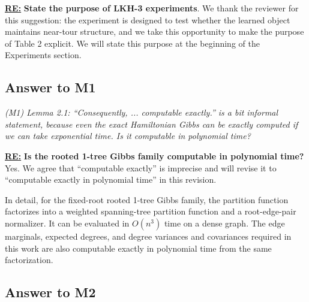 \textbf{\underline{RE:}}
\textbf{State the purpose of LKH-3 experiments}. We thank the reviewer for this suggestion: the experiment is designed to test whether the learned object maintains near-tour structure, and we take this opportunity to make the purpose of Table 2 explicit. We will state this purpose at the beginning of the Experiments section.



\subsection{Answer to M1}

\textit{(M1) Lemma 2.1: ``Consequently, ... computable exactly.'' is a bit informal statement, because even the exact Hamiltonian Gibbs can be exactly computed if we can take exponential time. Is it computable in polynomial time?}

\textbf{\underline{RE:}}
\textbf{Is the rooted 1-tree Gibbs family computable in polynomial time?}
Yes. We agree that ``computable exactly'' is imprecise and will revise it to ``computable exactly in polynomial time'' in this revision.

In detail, for the fixed-root rooted 1-tree Gibbs family, the partition function factorizes into a weighted spanning-tree partition function and a root-edge-pair normalizer. It can be evaluated in \(O(n^3)\) time on a dense graph. The edge marginals, expected degrees, and degree variances and covariances required in this work are also computable exactly in polynomial time from the same factorization.

\subsection{Answer to M2}

